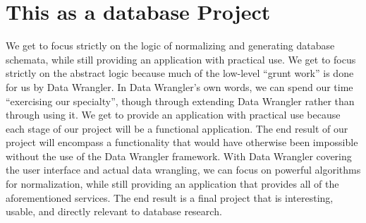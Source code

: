 \documentclass{../sty/acm_proc_article-sp}
\begin{document}
\section{This as a database Project}
We get to focus strictly on the logic of normalizing and generating database schemata, while still providing an application with practical use.
We get to focus strictly on the abstract logic because much of the low-level ``grunt work'' is done for us by Data Wrangler. In Data Wrangler's own words, we can spend our time ``exercising our specialty'', though through extending Data Wrangler rather than through using it.
We get to provide an application with practical use because each stage of our project will be a functional application. The end result of our project will encompass a functionality that would have otherwise been impossible without the use of the Data Wrangler framework. With Data Wrangler covering the user interface and actual data wrangling, we can focus on powerful algorithms for normalization, while still providing an application that provides all of the aforementioned services. The end result is a final project that is interesting, usable, and directly relevant to database research.
\end{document}
